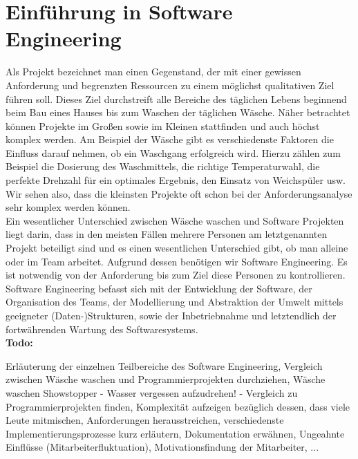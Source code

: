 \documentclass[a4paper]{article}
\begin{document}
\newpage


\section{Einführung in Software Engineering}

Als Projekt bezeichnet man einen Gegenstand, der mit einer gewissen Anforderung und begrenzten Ressourcen zu einem möglichst qualitativen Ziel führen soll. Dieses Ziel durchstreift alle Bereiche des täglichen Lebens beginnend beim Bau eines Hauses bis zum Waschen der täglichen Wäsche. Näher betrachtet können Projekte im Großen sowie im Kleinen stattfinden und auch höchst komplex werden. Am Beispiel der Wäsche gibt es verschiedenste Faktoren die Einfluss darauf nehmen, ob ein Waschgang erfolgreich wird. Hierzu zählen zum Beispiel die Dosierung des Waschmittels, die richtige Temperaturwahl, die perfekte Drehzahl für ein optimales Ergebnis, den Einsatz von Weichspüler usw. Wir sehen also, dass  die kleinsten Projekte oft schon bei der Anforderungsanalyse sehr komplex werden können. \\

Ein wesentlicher Unterschied zwischen Wäsche waschen und Software Projekten liegt darin, dass in den meisten Fällen mehrere Personen am letztgenannten Projekt beteiligt sind und es einen wesentlichen Unterschied gibt, ob man alleine oder im Team arbeitet. Aufgrund dessen benötigen wir Software Engineering. Es ist notwendig von der Anforderung bis zum Ziel diese Personen zu kontrollieren. Software Engineering befasst sich mit der Entwicklung der Software, der Organisation des Teams, der Modellierung und Abstraktion der Umwelt mittels geeigneter (Daten-)Strukturen, sowie der Inbetriebnahme und letztendlich der fortwährenden Wartung  des Softwaresystems. \\

\textbf{Todo:}

Erläuterung der einzelnen Teilbereiche des Software Engineering, Vergleich zwischen Wäsche waschen und Programmierprojekten durchziehen, Wäsche waschen Showstopper - Wasser vergessen aufzudrehen! - Vergleich zu Programmierprojekten finden, Komplexität aufzeigen bezüglich dessen, dass viele Leute mitmischen, Anforderungen herausstreichen, verschiedenste Implementierungsprozesse kurz erläutern, Dokumentation erwähnen, Ungeahnte Einflüsse (Mitarbeiterfluktuation), Motivationsfindung der Mitarbeiter, ...
\end{document}
